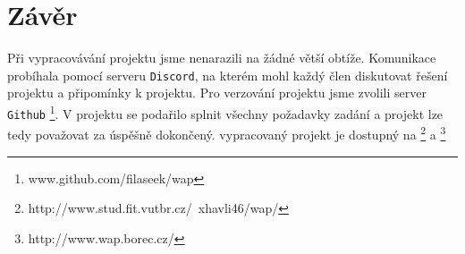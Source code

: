 \documentclass[11pt, a4paper]{article}
\begin{document}
\section{Závěr}
Při vypracovávání projektu jsme nenarazili na žádné větší obtíže. Komunikace probíhala pomocí serveru \texttt{Discord}, na kterém mohl každý člen diskutovat řešení projektu a připomínky k projektu. Pro verzování projektu jsme zvolili server \texttt{Github} \footnote{www.github.com/filaseek/wap}. V projektu se podařilo splnit všechny požadavky zadání a projekt lze tedy považovat za úspěšně dokončený. vypracovaný projekt je dostupný na \footnote{http://www.stud.fit.vutbr.cz/~xhavli46/wap/} a \footnote{http://www.wap.borec.cz/}
\end{document}
